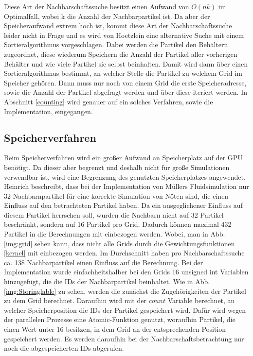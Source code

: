 \documentclass[intern,palatino]{cgBA}
\begin{document}
Diese Art der Nachbarschaftssuche besitzt einen Aufwand von $O(n k)$ im Optimalfall, wobei k die Anzahl der Nachbarpartikel ist. Da aber der Speicheraufwand extrem hoch ist, kommt diese Art der Nachbarschaftssuche leider nicht in Frage und es wird von Hoetzlein \cite{nvidia} eine alternative Suche mit einem Sortieralgorithmus vorgeschlagen.
\newline
Dabei werden die Partikel den Behältern zugeordnet, diese wiederum Speichern die Anzahl der Partikel aller vorherigen Behälter und wie viele Partikel sie selbst beinhalten. Damit wird dann über einen Sortieralgorithmus bestimmt, an welcher Stelle die Partikel zu welchem Grid im Speicher gehören. Dann muss nur noch von einem Grid die erste Speicheradresse, sowie die Anzahl der Partikel abgefragt werden und über diese iteriert werden.
\newline
In Abschnitt \ref{counting} wird genauer auf ein solches Verfahren, sowie die Implementation, eingegangen.


\subsection{Speicherverfahren}\label{speicher}

Beim Speicherverfahren wird ein großer Aufwand an Speicherplatz auf der GPU benötigt. Da dieser aber begrenzt und deshalb nicht für große Simulationen verwendbar ist, wird eine Begrenzung des genutzten Speicherplatzes angewendet. Heinrich \cite{nvidia2} beschreibt, dass bei der Implementation von Müllers \cite{muller2003particle} Fluidsimulation nur 32 Nachbarnpartikel für eine korrekte Simulation von Nöten sind, die einen Einfluss auf den betrachteten Partikel haben. Da ein ausgeglichener Einfluss auf diesem Partikel herrschen soll, wurden die Nachbarn nicht auf 32 Partikel beschränkt, sondern auf 16 Partikel pro Grid. Dadurch können maximal 432 Partikel in die Berechnungen mit einbezogen werden. Wobei, man in Abb. \ref{img:grid} sehen kann, dass nicht alle Grids durch die Gewichtungsfunktionen \ref{kernel} mit einbezogen werden. Im Durchschnitt haben pro Nachbarschaftssuche ca. 138 Nachbarpartikel einen Einfluss auf die Berechnung.
\newline
Bei der Implementation wurde einfachheitshalber bei den Grids 16 unsigned int Variablen hinzugefügt, die die IDs der Nachbarpartikel beinhaltet.
\newline
Wie in Abb. \ref{img:Storinglable} zu sehen, werden die zunächst die Zugehörigkeiten der Partikel zu dem Grid berechnet. Daraufhin wird mit der $count$ Variable berechnet, an welcher Speicherposition die IDs der Partikel gespeichert wird. Dafür wird wegen der parallelen Prozesse eine Atomic-Funktion genutzt, woraufhin Partikel, die einen Wert unter 16 besitzen, in dem Grid an der entsprechenden Position gespeichert werden. Es werden daraufhin bei der Nachbarschaftsbetrachtung nur noch die abgespeicherten IDs abgerufen. 
\end{document}
